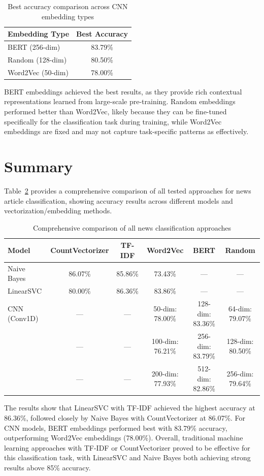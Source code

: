 \documentclass[12pt,a4paper]{article}
\begin{document}
\begin{table}[h]
\centering
\begin{tabular}{lc}
\toprule
Embedding Type & Best Accuracy \\
\midrule
BERT (256-dim) & 83.79\% \\
Random (128-dim) & 80.50\% \\
Word2Vec (50-dim) & 78.00\% \\
\bottomrule
\end{tabular}
\caption{Best accuracy comparison across CNN embedding types}
\label{tab:news_cnn_comparison}
\end{table}

BERT embeddings achieved the best results, as they provide rich contextual representations learned from large-scale pre-training. Random embeddings performed better than Word2Vec, likely because they can be fine-tuned specifically for the classification task during training, while Word2Vec embeddings are fixed and may not capture task-specific patterns as effectively.

\section{Summary}

Table~\ref{tab:news_all_comparison} provides a comprehensive comparison of all tested approaches for news article classification, showing accuracy results across different models and vectorization/embedding methods.

\begin{table}[h]
\centering
\begin{tabular}{lccccc}
\toprule
Model & CountVectorizer & TF-IDF & Word2Vec & BERT & Random \\
\midrule
Naive Bayes & 86.07\% & 85.86\% & 73.43\% & --- & --- \\
LinearSVC & 80.00\% & 86.36\% & 83.86\% & --- & --- \\
CNN (Conv1D) & --- & --- & 50-dim: 78.00\% & 128-dim: 83.36\% & 64-dim: 79.07\% \\
\quad & --- & --- & 100-dim: 76.21\% & 256-dim: 83.79\% & 128-dim: 80.50\% \\
\quad & --- & --- & 200-dim: 77.93\% & 512-dim: 82.86\% & 256-dim: 79.64\% \\
\bottomrule
\end{tabular}
\caption{Comprehensive comparison of all news classification approaches}
\label{tab:news_all_comparison}
\end{table}

The results show that LinearSVC with TF-IDF achieved the highest accuracy at 86.36\%, followed closely by Naive Bayes with CountVectorizer at 86.07\%. For CNN models, BERT embeddings performed best with 83.79\% accuracy, outperforming Word2Vec embeddings (78.00\%). Overall, traditional machine learning approaches with TF-IDF or CountVectorizer proved to be effective for this classification task, with LinearSVC and Naive Bayes both achieving strong results above 85\% accuracy.
\end{document}
